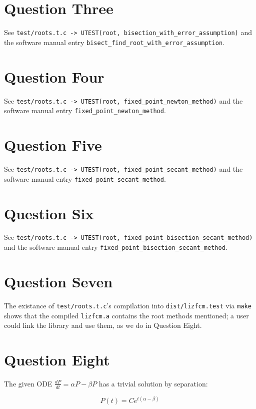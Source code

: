 \documentclass[11pt]{article}
\begin{document}
\section{Question Three}
\label{sec:org19aa326}

See \texttt{test/roots.t.c -> UTEST(root, bisection\_with\_error\_assumption)}
and the software manual entry \texttt{bisect\_find\_root\_with\_error\_assumption}.
\section{Question Four}
\label{sec:org722aa6a}

See \texttt{test/roots.t.c -> UTEST(root, fixed\_point\_newton\_method)}
and the software manual entry \texttt{fixed\_point\_newton\_method}.
\section{Question Five}
\label{sec:org587ee52}

See \texttt{test/roots.t.c -> UTEST(root, fixed\_point\_secant\_method)}
and the software manual entry \texttt{fixed\_point\_secant\_method}.
\section{Question Six}
\label{sec:org79bf754}

See \texttt{test/roots.t.c -> UTEST(root, fixed\_point\_bisection\_secant\_method)}
and the software manual entry \texttt{fixed\_point\_bisection\_secant\_method}.
\section{Question Seven}
\label{sec:org4cb47e5}

The existance of \texttt{test/roots.t.c}'s compilation into \texttt{dist/lizfcm.test} via \texttt{make}
shows that the compiled \texttt{lizfcm.a} contains the root methods mentioned; a user
could link the library and use them, as we do in Question Eight.
\section{Question Eight}
\label{sec:org4a8160d}

The given ODE \(\frac{dP}{dt} = \alpha P - \beta P\) has a trivial solution by separation:

\begin{equation*}
P(t) = C e^{t(\alpha - \beta)}
\end{equation*}
\end{document}
